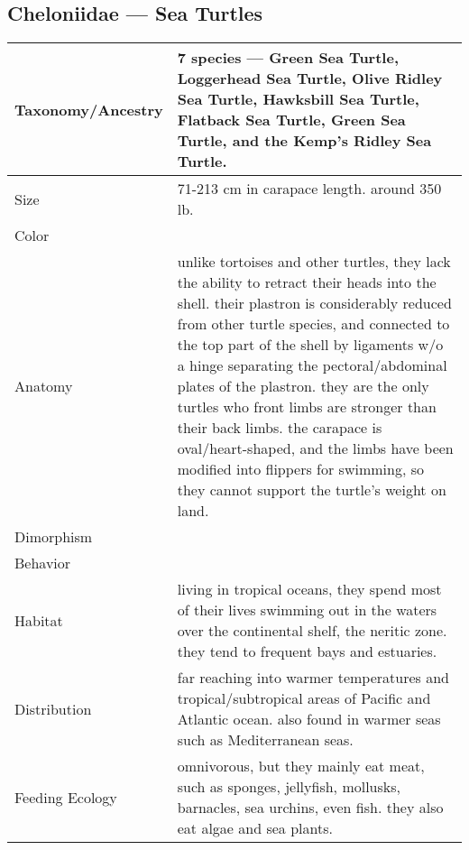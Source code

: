 \subsection{Cheloniidae --- Sea Turtles}
\begin{center}
\begin{longtabu} to 

	\hline
	Taxonomy/Ancestry &
	7 species --- Green Sea Turtle, Loggerhead Sea Turtle, Olive Ridley Sea Turtle, Hawksbill Sea Turtle, Flatback Sea Turtle,  Green Sea Turtle, and the Kemp's Ridley Sea Turtle.
	
	 \\
	\hline
	Size & 
	71-213 cm in carapace length. around 350 lb.
	\\
	\hline
	Color &
	
	 \\
	\hline
	Anatomy &
	unlike tortoises and other turtles, they lack the ability to retract their heads into the shell. their plastron is considerably reduced from other turtle species, and connected to the top part of the shell by ligaments w/o a hinge separating the pectoral/abdominal plates of the plastron. they are the only turtles who front limbs are stronger than their back limbs. the carapace is oval/heart-shaped, and the limbs have been modified into flippers for swimming, so they cannot support the turtle's weight on land.
	 \\
	\hline
	Dimorphism & 
	
	\\
	\hline
	Behavior & 
	
	\\
	\hline
	Habitat & 
	living in tropical oceans, they spend most of their lives swimming out in the waters over the continental shelf, the neritic zone. they tend to frequent bays and estuaries.
	\\
	\hline
	Distribution & 
	far reaching into warmer temperatures and tropical/subtropical areas of Pacific and Atlantic ocean. also found in warmer seas such as Mediterranean seas.
	\\
	\hline
	Feeding Ecology & 
	omnivorous, but they mainly eat meat, such as sponges, jellyfish, mollusks, barnacles, sea urchins, even fish. they also eat algae and sea plants. 
	

\end{longtabu}
\end{center}
